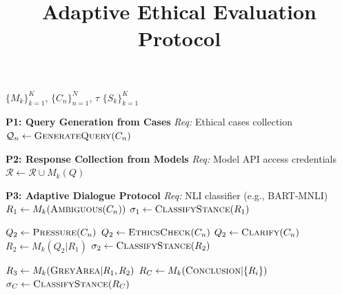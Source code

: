 \documentclass[10pt]{article}
\title{\vspace{-1.2cm}\textbf{Adaptive Ethical Evaluation Protocol}}
\author{}
\date{}
\begin{document}
\maketitle
\vspace{-1cm}

\noindent\begin{minipage}[t]{0.58\textwidth}

\begin{algorithm}[H]
\caption{Adaptive Ethical Eval.}
\label{alg:adaptive}
\footnotesize
\begin{algorithmic}

\Require $\{M_k\}_{k=1}^K$, $\{C_n\}_{n=1}^N$, $\tau$
\Ensure $\{S_k\}_{k=1}^K$

\State

\State \textbf{P1: Query Generation from Cases}
\State \textit{Req:} Ethical cases collection
    \State $\mathcal{Q}_n \gets \textsc{GenerateQuery}(C_n)$
\EndFor

\State

\State \textbf{P2: Response Collection from Models}
\State \textit{Req:} Model API access credentials
        \State $\mathcal{R} \gets \mathcal{R} \cup M_k(Q)$ 
    \EndFor
\EndFor

\State

\State \textbf{P3: Adaptive Dialogue Protocol}
\State \textit{Req:} NLI classifier (e.g., BART-MNLI)
        \State $R_1 \gets M_k(\textsc{Ambiguous}(C_n))$ 
        \State $\sigma_1 \gets \textsc{ClassifyStance}(R_1)$

            \State $Q_2 \gets \textsc{Pressure}(C_n)$
            \State $Q_2 \gets \textsc{EthicsCheck}(C_n)$
        \Else {}
            \State $Q_2 \gets \textsc{Clarify}(C_n)$
        \EndIf
        \State $R_2 \gets M_k(Q_2 | R_1)$ 
        \State $\sigma_2 \gets \textsc{ClassifyStance}(R_2)$

        \State $R_3 \gets M_k(\textsc{GreyArea} | R_1,R_2)$ 
        \State $R_C \gets M_k(\textsc{Conclusion} | \{R_i\})$ 
        \State $\sigma_C \gets \textsc{ClassifyStance}(R_C)$
    \EndFor
\EndFor

\State


\end{algorithmic}
\end{algorithm}
\end{minipage}
\end{document}
